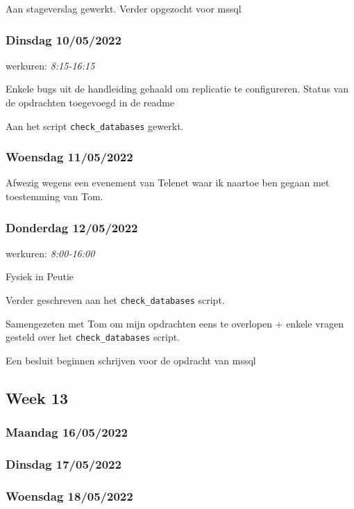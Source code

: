 Aan stageverslag gewerkt. Verder opgezocht voor mssql

\subsubsection{Dinsdag 10/05/2022}

werkuren: \emph{8:15-16:15}

Enkele bugs uit de handleiding gehaald om replicatie te configureren.  
Status van de opdrachten toegevoegd in de readme

Aan het script \verb*|check_databases| gewerkt.

\subsubsection{Woensdag 11/05/2022}

Afwezig wegens een evenement van Telenet waar ik naartoe ben gegaan met toestemming van Tom.

\subsubsection{Donderdag 12/05/2022}

werkuren: \emph{8:00-16:00}

Fysiek in Peutie

Verder geschreven aan het \verb*|check_databases| script.

Samengezeten met Tom om mijn opdrachten eens te overlopen + enkele vragen gesteld over het \verb*|check_databases| script.

Een besluit beginnen schrijven voor de opdracht van mssql

\subsection{Week 13}

\subsubsection{Maandag 16/05/2022}

\subsubsection{Dinsdag 17/05/2022}

\subsubsection{Woensdag 18/05/2022}

